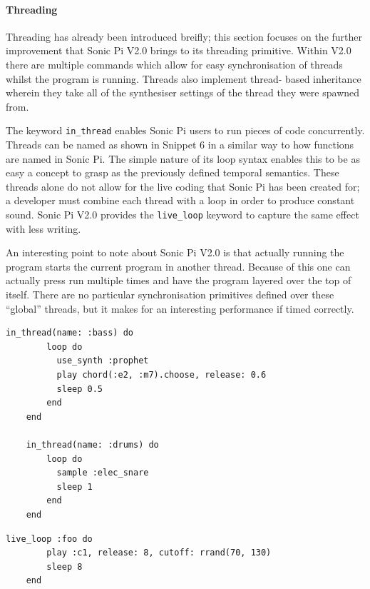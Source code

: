 \documentclass[11pt, abstracton, twoside]{scrartcl}
\begin{document}
\paragraph{Threading}

Threading has already been introduced breifly; this section focuses on the 
further improvement that Sonic Pi V2.0 brings to its threading primitive. 
Within V2.0 there are multiple commands which allow for easy synchronisation 
of threads whilst the program is running. Threads also implement thread-
based inheritance wherein they take all of the synthesiser settings of the 
thread they were spawned from.

The keyword \texttt{in\_thread} enables Sonic Pi users to run pieces of 
code concurrently. Threads can be named as shown in Snippet 6 in a similar way 
to how functions are named in Sonic Pi. The simple nature of its loop syntax 
enables this to be as easy a concept to grasp as the previously defined 
temporal semantics. These threads alone do not allow for the live coding that 
Sonic Pi has been created for; a developer must combine each thread with a loop
in order to produce constant sound. Sonic Pi V2.0 provides the \texttt{live\_loop}
keyword to capture the same effect with less writing.

An interesting point to note about Sonic Pi V2.0 is that actually running the 
program starts the current program in another thread. Because of this one can 
actually press run multiple times and have the program layered over the top of 
itself. There are no particular synchronisation primitives defined over these 
``global'' threads, but it makes for an interesting performance if timed 
correctly.

\begin{minipage}{\textwidth}
	\begin{lstlisting}[style = sonicpi]
    in_thread(name: :bass) do
        loop do
          use_synth :prophet
          play chord(:e2, :m7).choose, release: 0.6
          sleep 0.5
        end
    end

    in_thread(name: :drums) do
        loop do
          sample :elec_snare
          sleep 1
        end
    end
	\end{lstlisting}
\end{minipage}

\begin{minipage}{\textwidth}
	\begin{lstlisting}[style = sonicpi]
    live_loop :foo do
        play :c1, release: 8, cutoff: rrand(70, 130)
        sleep 8
    end
	\end{lstlisting}
\end{minipage}
\end{document}
